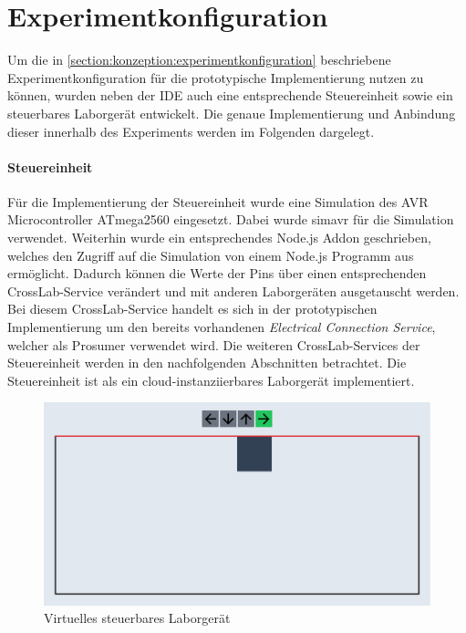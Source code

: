 \section{Experimentkonfiguration}\label{section:prototypische-implementierung:experimentkonfiguration}

Um die in \autoref{section:konzeption:experimentkonfiguration} beschriebene Experimentkonfiguration für die prototypische Implementierung nutzen zu können, wurden neben der IDE auch eine entsprechende Steuereinheit sowie ein steuerbares Laborgerät entwickelt. Die genaue Implementierung und Anbindung dieser innerhalb des Experiments werden im Folgenden dargelegt.

\paragraph{Steuereinheit}
Für die Implementierung der Steuereinheit wurde eine Simulation des AVR Microcontroller ATmega2560 \cite{noauthor_atmega2560_nodate} eingesetzt. Dabei wurde simavr \cite{pollet_simavr_2025} für die Simulation verwendet. Weiterhin wurde ein entsprechendes Node.js Addon geschrieben, welches den Zugriff auf die Simulation von einem Node.js Programm aus ermöglicht. Dadurch können die Werte der Pins über einen entsprechenden CrossLab-Service verändert und mit anderen Laborgeräten ausgetauscht werden. Bei diesem CrossLab-Service handelt es sich in der prototypischen Implementierung um den bereits vorhandenen \textit{Electrical Connection Service}, welcher als Prosumer verwendet wird. Die weiteren CrossLab-Services der Steuereinheit werden in den nachfolgenden Abschnitten betrachtet. Die Steuereinheit ist als ein cloud-instanziierbares Laborgerät implementiert.

\begin{figure}[tbp]
    \centering
    \includegraphics[trim={0 3px 0 0},clip,width=\textwidth]{images/vpspu.png}
    \caption{Virtuelles steuerbares Laborgerät}
    \label{figure:vpspu}
\end{figure}

